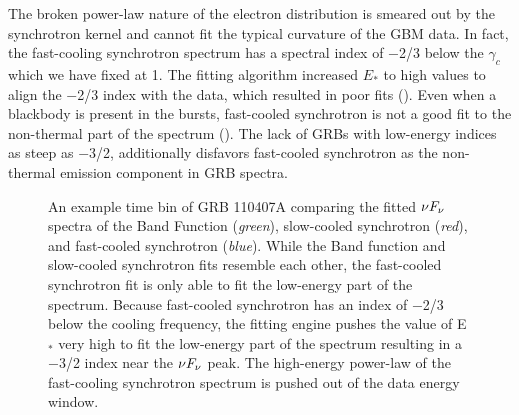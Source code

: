 The broken power-law nature of the electron
distribution is smeared out by the synchrotron kernel and cannot fit
the typical curvature of the GBM data. In fact, the fast-cooling
synchrotron spectrum has a spectral index of $-$2/3 below the
$\gamma_c$ which we have fixed at 1. The fitting algorithm increased
$E_*$ to high values to align the $-$2/3 index with the data, which
resulted in poor fits (). Even when a
blackbody is present in the bursts, fast-cooled synchrotron is not a
good fit to the non-thermal part of the spectrum
(). The lack of GRBs with low-energy indices as
steep as $-$3/2, additionally disfavors fast-cooled synchrotron as the
non-thermal emission component in GRB spectra.
\begin{figure}[h!]

 \centering


  \caption{An example time bin of GRB 110407A comparing the fitted
    $\nu F_{\nu}$ spectra of the Band Function (\emph{green}),
    slow-cooled synchrotron (\emph{red}), and fast-cooled synchrotron
    (\emph{blue}). While the Band function and slow-cooled synchrotron
    fits resemble each other, the fast-cooled synchrotron fit is only
    able to fit the low-energy part of the spectrum. Because
    fast-cooled synchrotron has an index of $-$2/3 below the cooling
    frequency, the fitting engine pushes the value of E$_*$ very high
    to fit the low-energy part of the spectrum resulting in a $-$3/2
    index near the $\nu F_{\nu}$ peak. The high-energy power-law of
    the fast-cooling synchrotron spectrum is pushed out of the data
    energy window.}

  \label{fig:fastComp}

\end{figure}

